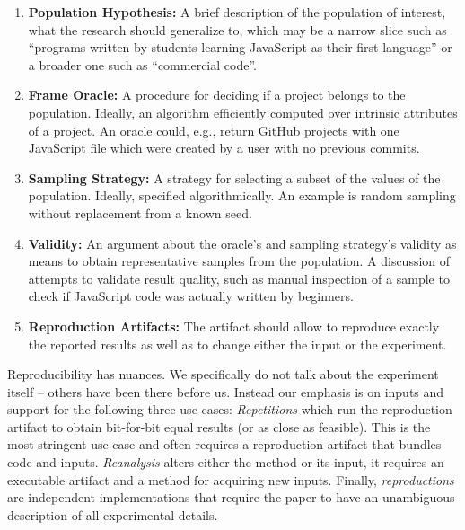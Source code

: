 \documentclass[sigconf,review,anonymous]{acmart}
\newcommand{\gh}{{GitHub}\xspace}
\begin{document}
\begin{enumerate}[leftmargin=*]
\item {\bf Population Hypothesis:} A brief description of the population of
  interest, what the research should generalize to, which may be a narrow slice
  such as ``programs written by students learning JavaScript as their first
  language'' or a broader one such as ``commercial code''.
\item {\bf Frame Oracle:} A procedure for deciding if a project belongs to the
  population. Ideally, an algorithm efficiently computed over intrinsic
  attributes of a project. An oracle could, e.g., return \gh projects with one
  JavaScript file which were created by a user with no previous commits.
\item {\bf Sampling Strategy:} A strategy for selecting a subset of the values
  of the population. Ideally, specified algorithmically. An example is random
  sampling without replacement from a known seed.
\item {\bf Validity:} An argument about the oracle's and sampling strategy's
  validity as means to obtain representative samples from the population. A
  discussion of attempts to validate result quality, such as manual inspection
  of a sample to check if JavaScript code was actually written by beginners.
\item {\bf Reproduction Artifacts:} The artifact should allow to reproduce
  exactly the reported results as well as to change either the input or the
  experiment.
\end{enumerate}

\noindent
Reproducibility has nuances. We specifically do not talk about the experiment
itself -- others have been there before us. Instead our emphasis is on inputs
and support for the following three use cases: \emph{Repetitions} which run the
reproduction artifact to obtain bit-for-bit equal results (or as close as
feasible). This is the most stringent use case and often requires a reproduction
artifact that bundles code and inputs. \emph{Reanalysis} alters either the
method or its input, it requires an executable artifact and a method for
acquiring new inputs. Finally, \emph{reproductions} are independent
implementations that require the paper to have an unambiguous description of all
experimental details.
\end{document}
